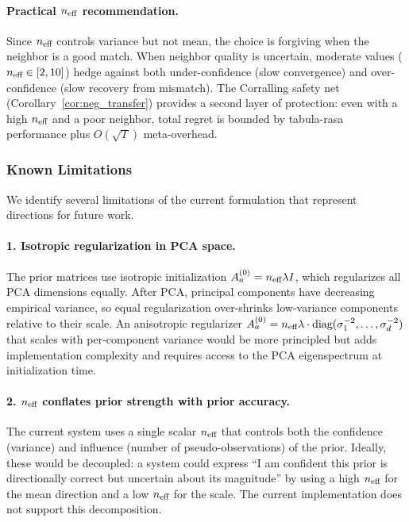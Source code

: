 \paragraph{Practical $n_{\text{eff}}$ recommendation.}
Since $n_{\text{eff}}$ controls variance but not mean, the choice is forgiving when the
neighbor is a good match.  When neighbor quality is uncertain, moderate values
($n_{\text{eff}} \in [2, 10]$) hedge against both under-confidence (slow convergence)
and over-confidence (slow recovery from mismatch).  The Corralling safety net
(Corollary~\ref{cor:neg_transfer}) provides a second layer of protection: even
with a high $n_{\text{eff}}$ and a poor neighbor, total regret is bounded by
tabula-rasa performance plus $O(\sqrt{T})$ meta-overhead.

\subsubsection{Known Limitations}
\label{appendix:warmup_limitations}

We identify several limitations of the current formulation that represent
directions for future work.

\paragraph{1. Isotropic regularization in PCA space.}
The prior matrices use isotropic initialization $A_a^{(0)} = n_{\text{eff}} \lambda I$,
which regularizes all PCA dimensions equally.  After PCA, principal components
have decreasing empirical variance, so equal regularization
over-shrinks low-variance components relative to their scale.  An anisotropic
regularizer $A_a^{(0)} = n_{\text{eff}} \lambda \cdot \text{diag}(\sigma_1^{-2},
\ldots, \sigma_d^{-2})$ that scales with per-component variance would be more
principled but adds implementation complexity and requires access to the PCA
eigenspectrum at initialization time.

\paragraph{2. $n_{\text{eff}}$ conflates prior strength with prior accuracy.}
The current system uses a single scalar $n_{\text{eff}}$ that controls both the
confidence (variance) and influence (number of pseudo-observations) of the
prior.  Ideally, these would be decoupled: a system could express ``I am
confident this prior is directionally correct but uncertain about its
magnitude'' by using a high $n_{\text{eff}}$ for the mean direction and a low
$n_{\text{eff}}$ for the scale.  The current implementation does not support this
decomposition.

